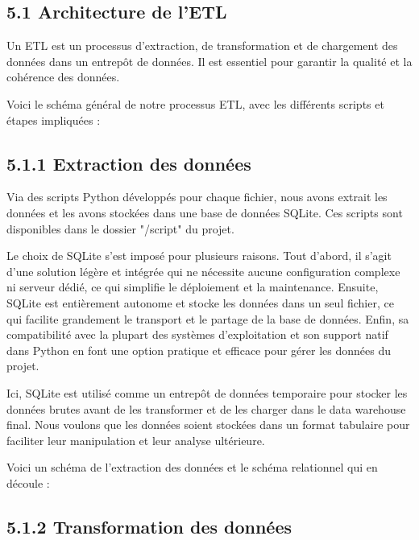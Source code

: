 \begin{itemize}
\begin{itemize}
\section*{5.1 Architecture de l’ETL}

Un ETL est un processus d’extraction, de transformation et de chargement des données dans un entrepôt de données. Il est essentiel pour garantir la qualité et la cohérence des données.

Voici le schéma général de notre processus ETL, avec les différents scripts et étapes impliquées :


\subsection{5.1.1 Extraction des données}

Via des scripts Python développés pour chaque fichier, nous avons extrait les données et les avons stockées dans une base de données SQLite.
Ces scripts sont disponibles dans le dossier "/script" du projet.

Le choix de SQLite s’est imposé pour plusieurs raisons. Tout d’abord, il s’agit d’une solution légère et intégrée qui ne nécessite aucune configuration complexe ni serveur dédié,
ce qui simplifie le déploiement et la maintenance. Ensuite, SQLite est entièrement autonome et stocke les données dans un seul fichier, ce qui facilite grandement le transport et le
partage de la base de données. Enfin, sa compatibilité avec la plupart des systèmes d’exploitation et son support natif dans Python en font une option pratique et efficace pour
gérer les données du projet.

Ici, SQLite est utilisé comme un entrepôt de données temporaire pour stocker les données brutes avant de les transformer et de les charger dans le data warehouse final.
Nous voulons que les données soient stockées dans un format tabulaire pour faciliter leur manipulation et leur analyse ultérieure.

Voici un schéma de l'extraction des données et le schéma relationnel qui en découle :

\subsection{5.1.2 Transformation des données}


\end{itemize}
\end{itemize}
